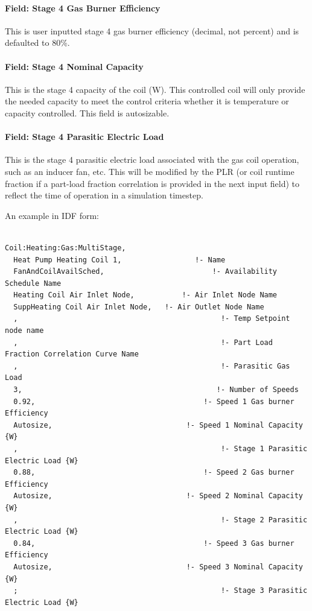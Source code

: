 \paragraph{Field: Stage 4 Gas Burner Efficiency}\label{field-stage-4-gas-burner-efficiency}

This is user inputted stage 4 gas burner efficiency (decimal, not percent) and is defaulted to 80\%.

\paragraph{Field: Stage 4 Nominal Capacity}\label{field-stage-4-nominal-capacity-1}

This is the stage 4 capacity of the coil (W). This controlled coil will only provide the needed capacity to meet the control criteria whether it is temperature or capacity controlled. This field is autosizable.

\paragraph{Field: Stage 4 Parasitic Electric Load}\label{field-stage-4-parasitic-electric-load}

This is the stage 4 parasitic electric load associated with the gas coil operation, such as an inducer fan, etc. This will be modified by the PLR (or coil runtime fraction if a part-load fraction correlation is provided in the next input field) to reflect the time of operation in a simulation timestep.

An example in IDF form:

\begin{lstlisting}

Coil:Heating:Gas:MultiStage,
  Heat Pump Heating Coil 1,                 !- Name
  FanAndCoilAvailSched,                         !- Availability Schedule Name
  Heating Coil Air Inlet Node,           !- Air Inlet Node Name
  SuppHeating Coil Air Inlet Node,   !- Air Outlet Node Name
  ,                                               !- Temp Setpoint node name
  ,                                               !- Part Load Fraction Correlation Curve Name
  ,                                               !- Parasitic Gas Load
  3,                                             !- Number of Speeds
  0.92,                                       !- Speed 1 Gas burner Efficiency
  Autosize,                               !- Speed 1 Nominal Capacity {W}
  ,                                               !- Stage 1 Parasitic Electric Load {W}
  0.88,                                       !- Speed 2 Gas burner Efficiency
  Autosize,                               !- Speed 2 Nominal Capacity {W}
  ,                                               !- Stage 2 Parasitic Electric Load {W}
  0.84,                                       !- Speed 3 Gas burner Efficiency
  Autosize,                               !- Speed 3 Nominal Capacity {W}
  ;                                               !- Stage 3 Parasitic Electric Load {W}
\end{lstlisting}

